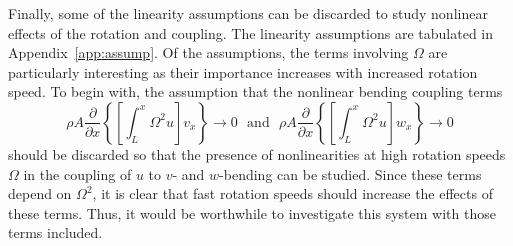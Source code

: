Finally, some of the linearity assumptions can be discarded to study nonlinear effects of the rotation and coupling. The linearity assumptions are tabulated in Appendix~\ref{app:assump}. Of the assumptions, the terms involving $\Omega$ are particularly interesting as their importance increases with increased rotation speed. To begin with, the assumption that the nonlinear bending coupling terms
\[\rho A\frac{\partial}{\partial x}\left\{\left[\int_L^x\Omega^2u\right]v_x\right\}\rightarrow 0\text{~~and~~}\rho A\frac{\partial}{\partial x}\left\{\left[\int_L^x\Omega^2u\right]w_x\right\}\rightarrow 0\]
should be discarded so that the presence of nonlinearities at high rotation speeds $\Omega$ in the coupling of $u$ to $v$- and $w$-bending can be studied. Since these terms depend on $\Omega^2$, it is clear that fast rotation speeds should increase the effects of these terms. Thus, it would be worthwhile to investigate this system with those terms included.